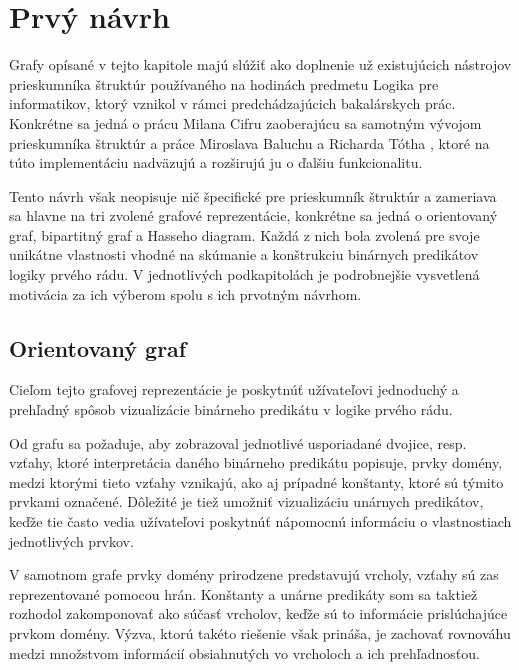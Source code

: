 \chapter{Prvý návrh}
\label{kap:prvy_navrh} %

Grafy opísané v tejto kapitole majú slúžiť ako doplnenie už existujúcich nástrojov prieskumníka štruktúr používaného na hodinách predmetu Logika pre informatikov, ktorý vznikol v rámci predchádzajúcich bakalárskych prác. Konkrétne sa jedná o prácu Milana Cifru \cite{cifra2018} zaoberajúcu sa samotným vývojom prieskumníka štruktúr a práce Miroslava Baluchu \cite{baluch2020} a Richarda Tótha \cite{toth2021}, ktoré na túto implementáciu nadväzujú a rozširujú ju o ďalšiu funkcionalitu.

Tento návrh však neopisuje nič špecifické pre prieskumník štruktúr a zameriava sa hlavne na tri zvolené grafové reprezentácie, konkrétne sa jedná o orientovaný graf, bipartitný graf a Hasseho diagram. Každá z nich bola zvolená pre svoje unikátne vlastnosti vhodné na skúmanie a konštrukciu binárnych predikátov logiky prvého rádu. V jednotlivých podkapitolách je podrobnejšie vysvetlená motivácia za ich výberom spolu s ich prvotným návrhom.

\section{Orientovaný graf}
\label{sec:basic_graph}

Cieľom tejto grafovej reprezentácie je poskytnúť užívateľovi jednoduchý a prehľadný spôsob vizualizácie binárneho predikátu v logike prvého rádu.

Od grafu sa požaduje, aby zobrazoval jednotlivé usporiadané dvojice, resp. vzťahy, ktoré interpretácia daného binárneho predikátu popisuje, prvky domény, medzi ktorými tieto vzťahy vznikajú, ako aj prípadné konštanty, ktoré sú týmito prvkami označené. Dôležité je tiež umožniť vizualizáciu unárnych predikátov, keďže tie často vedia užívateľovi poskytnúť nápomocnú informáciu o vlastnostiach jednotlivých prvkov.

V samotnom grafe prvky domény prirodzene predstavujú vrcholy, vzťahy sú zas reprezentované pomocou hrán. Konštanty a unárne predikáty som sa taktiež rozhodol zakomponovať ako súčasť vrcholov, keďže sú to informácie prislúchajúce prvkom domény. Výzva, ktorú takéto riešenie však prináša, je zachovať rovnováhu medzi množstvom informácií obsiahnutých vo vrcholoch a ich prehľadnosťou.

